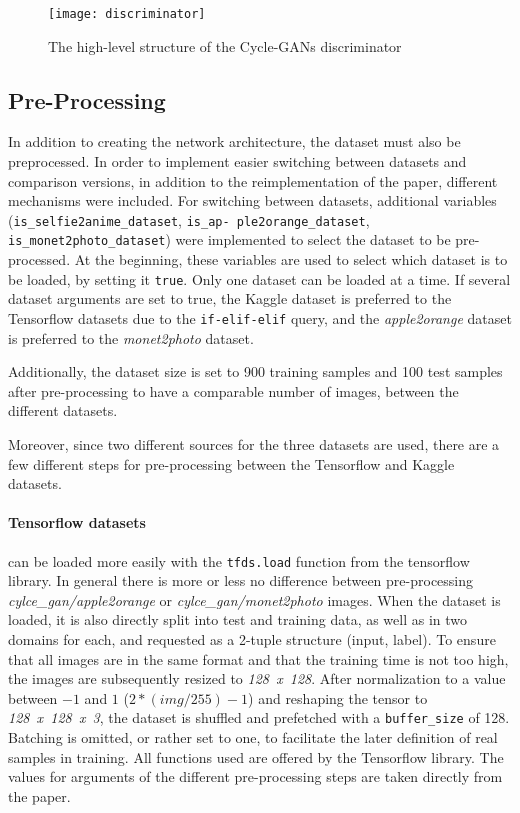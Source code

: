 \documentclass[fleqn,10pt]{SelfArx} %
\begin{document}
\begin{figure*}[htb] 
	\centering 
	\texttt{[image: discriminator]}
	\caption{The high-level structure of the Cycle-\ac{GAN}s discriminator \cite{Introduction-to-Cycle-GANs}}
	\label{fig:discriminator}
\end{figure*}

\subsection{Pre-Processing}
In addition to creating the network architecture, the dataset must also be preprocessed. In order to implement easier switching between datasets and comparison versions, in addition to the reimplementation of the paper, different mechanisms were included. For switching between datasets, additional variables (\texttt{is\_selfie2anime\_dataset}, \texttt{is\_ap- ple2orange\_dataset}, \texttt{is\_monet2photo\_dataset}) were implemented to select the dataset to be pre-processed. At the beginning, these variables are used to select which dataset is to be loaded, by setting it \texttt{true}. Only one dataset can be loaded at a time. If several dataset arguments are set to true, the Kaggle dataset is preferred to the Tensorflow datasets due to the \texttt{if-elif-elif} query, and the \textit{apple2orange} dataset is preferred to the \textit{monet2photo} dataset.

Additionally, the dataset size is set to 900 training samples and 100 test samples after pre-processing to have a comparable number of images, between the different datasets. 

Moreover, since two different sources for the three datasets are used, there are a few different steps for pre-processing between the Tensorflow and Kaggle datasets. 

\paragraph{Tensorflow datasets} can be loaded more easily with the \texttt{tfds.load} function from the tensorflow library. In general there is more or less no difference between pre-processing \textit{cylce\_gan/apple2orange} or \textit{cylce\_gan/monet2photo} images. When the dataset is loaded, it is also directly split into test and training data, as well as in two domains for each, and requested as a 2-tuple structure (input, label). To ensure that all images are in the same format and that the training time is not too high, the images are subsequently resized to \textit{128~x~128}. After normalization to a value between $-1$ and $1$ ($2 * (img / 255) - 1$) and reshaping the tensor to \textit{128~x~128~x~3}, the dataset is shuffled and prefetched with a \texttt{buffer\_size} of 128. Batching is omitted, or rather set to one, to facilitate the later definition of real samples in training. All functions used are offered by the Tensorflow library. The values for arguments of the different pre-processing steps are taken directly from the paper.~\cite{image-to-image-ccan}
\end{document}
